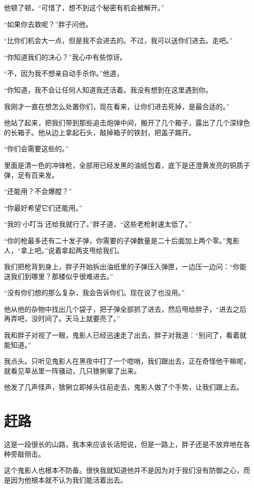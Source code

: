 他顿了顿，“可惜了，想不到这个秘密有机会被解开。”

“如果你去救呢？”胖子问他。

“比你们机会大一点，但是我不会进去的。不过，我可以送你们进去。走吧。”

“你知道我们的决心？”我心中有些惊讶。

“不，因为我不想亲自动手杀你。”他道，

“你知道，我不会让任何人知道我还活着。我没有想到在这里遇到你。

我刚才一直在想怎么处置你们，现在看来，让你们进去死掉，是最合适的。”

他站了起来，把我们带到那些追击炮弹中间，搬开了几个箱子，露出了几个深绿色的长箱子。他从边上拿起石头，敲掉箱子的铁封，把盖子踹开。

“你们会需要这些的。”

里面是清一色的冲锋枪，全部用已经发黑的油纸包着，底下是还澄黄发亮的铜质子弹，足有百来发。

“还能用？不会爆膛？”

“你最好希望它们还能用。”

“我的‘小叮当’还给我就行了。”胖子道，“这些老枪射速太低了。”

“你的枪最多还有二十发子弹，你需要的子弹数量是二十后面加上两个零。”鬼影人，“拿上吧。”说着拿起两支甩给我们。

我们把枪背到身上，胖子开始拆出油纸里的子弹压入弹匣，一边压一边问：“你能送我们到哪里？那楼似乎很难进去。”

“没有你们想的那么复杂，我会告诉你们。现在说了也没用。”

他从他的杂物中找出几个袋子，把子弹全部抓了进去，然后甩给胖子，“进去之后再弄吧，没时间了。天马上就要亮了。”

我和胖子对视了一眼，鬼影人已经迅速走了出去，胖子对我道：“别问了，看着就能知道。”

我点头。只听见鬼影人在黑夜中打了一个唿哨，我们跟出去，正在奇怪他干嘛呢，就看见草丛里一阵骚动，几只猞猁窜了出来。

他发了几声怪声，猞猁立即掉头往前走去，鬼影人做了个手势，让我们跟上去。

\chapter{赶路}

这是一段很长的山路，我本来应该长话短说，但是一路上，胖子还是不放弃地在各种旁敲侧击。

这个鬼影人也根本不防备。很快我就知道他并不是因为对于我们没有防御之心，而是因为他根本就不认为我们能活着出去。

